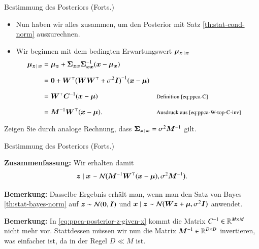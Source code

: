 \begin{frame}{Bestimmung des Posteriors (Forts.)}{}
	\begin{itemize}
		\item Nun haben wir alles zusammen, um den Posterior mit Satz \ref{th:stat-cond-norm} auszurechnen.
		\item Wir beginnen mit dem bedingten Erwartungswert $\bm{\mu}_{\bm{z}\,\mid\,\bm{x}}$
		\begin{equation}
			\begin{aligned}
				\bmu_{\bz\,\mid\,\bx}
					&= \bmu_{\bz} + \bSigma_{\bz\bx} \bSigma_{\bx\bx}^{-1} (\bx - \bmu_{\bx})
			\\[2mm]
					&= \0 + \bW^\top \bigl( \bW \bW^\top + \sigma^2 \bI \bigr)^{-1} (\bx - \bmu)
			\\[2mm]
					&= \bW^\top \bC^{-1} (\bx - \bmu)
					&& \rem{Definition \eqref{eq:ppca-C}}
			\\[2mm]
					&= \bM^{-1} \bW^\top (\bx - \bmu).
					&& \rem{Ausdruck aus \eqref{eq:ppca-W-top-C-inv}}
			\end{aligned}
		\end{equation}
	\end{itemize}
	
	\begin{mytask}
		Zeigen Sie durch analoge Rechnung, dass $\bm{\Sigma}_{\bm{z}\,\mid\,\bm{x}} = \sigma^2 \bm{M}^{-1}$ gilt.
	\end{mytask}
\end{frame}


\begin{frame}{Bestimmung des Posteriors (Forts.)}{}
	\begin{boxGray}
		\textbf{Zusammenfassung:} Wir erhalten damit
		\begin{equation} \label{eq:ppca-posterior-z-given-x}
			\bm{z} \mid \bm{x} \sim \mathcal{N}\bigl( \bm{M}^{-1} \bm{W}^\top (\bm{x} - \bm{\mu}), \sigma^2 \bm{M}^{-1} \bigr).
		\end{equation}
	\end{boxGray}
	
	\begin{boxGray}
		\textbf{Bemerkung:} Dasselbe Ergebnis erhält man, wenn man den Satz von Bayes \ref{th:stat-bayes-norm}
		auf $\bm{z} \sim \mathcal{N}(\bm{0}, \bm{I})$ und $\bm{x} \mid \bm{z} \sim \mathcal{N}\bigl( \bm{W} \bm{z} + \bm{\mu}, \sigma^2 \bm{I} \bigr)$ anwendet.
	\end{boxGray}
	
	\begin{boxGray}
		\textbf{Bemerkung:} In \eqref{eq:ppca-posterior-z-given-x} kommt die Matrix $C^{-1} \in \mathbb{R}^{M \times M}$ nicht mehr vor.
		Stattdessen müssen wir nun die Matrix $\bm{M}^{-1} \in \mathbb{R}^{D \times D}$ invertieren, was einfacher ist, da
		in der Regel $D \ll M$ ist.
	\end{boxGray}
\end{frame}


